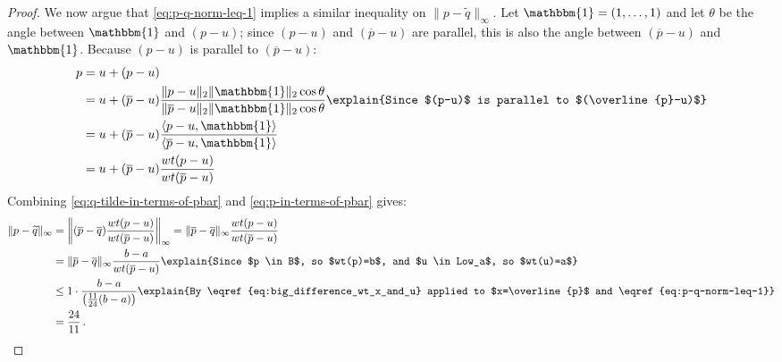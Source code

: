 \documentclass[11pt]{article}
\begin{document}
\begin{proof}
    We now argue that \eqref{eq:p-q-norm-leq-1} implies a similar inequality on $\|p - \widetilde{q}\|_{\infty}$. Let $\mathbbm{1} = (1, \ldots, 1)$ and let $\theta$ be the angle between $\mathbbm{1}$ and $(p-u)$; since $(p-u)$ and $(\overline{p} - u)$ are parallel, this is also the angle between $(\overline{p} - u)$ and $\mathbbm{1}$. Because $(p-u)$ is parallel to $(\overline{p} - u)$:
    \begin{align}
        p &= u + (p - u) \\
        &= u + (\overline{p} - u) \frac{\|p-u\|_2 \|\mathbbm{1}\|_2 \cos \theta}{\|\overline{p} - u\|_2 \|\mathbbm{1}\|_2 \cos \theta} \explain{Since $(p-u)$ is parallel to $(\overline{p}-u)$} \\
        &= u + (\overline{p} - u) \frac{\langle p-u, \mathbbm{1} \rangle}{\langle \overline{p} - u, \mathbbm{1} \rangle} \\
        &= u + (\overline{p} - u) \frac{wt(p-u)}{wt(\overline{p}-u)} \label{eq:p-in-terms-of-pbar}
    \end{align}
    Combining \eqref{eq:q-tilde-in-terms-of-pbar} and \eqref{eq:p-in-terms-of-pbar} gives:
    \begin{align}
        \|p - \widetilde{q}\|_{\infty} &= \left\|(\overline{p}-\overline{q})\frac{wt(p-u)}{wt(\overline{p}-u)} \right\|_{\infty} = \|\overline{p} - \overline{q}\|_{\infty} \frac{wt(p-u)}{wt(\overline{p}-u)} \notag \\
        & = \|\overline{p} - \overline{q}\|_{\infty} \frac{b-a}{wt(\overline{p}-u)} \explain{Since $p \in B$, so $wt(p)=b$, and $u \in Low_a$, so $wt(u)=a$}\\
        &\leq 1 \cdot \frac{b-a}{\left(\frac{11}{24}(b-a)\right)} \explain{By \eqref{eq:big_difference_wt_x_and_u} applied to $x=\overline{p}$ and \eqref{eq:p-q-norm-leq-1}} \\
        &= \frac{24}{11} \,. \label{eq:diff_p_q_tilde_at_most_3}
    \end{align}


\end{proof}
\end{document}
